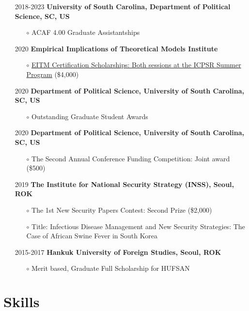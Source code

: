 \documentclass[margin,line]{res}
\begin{document}
\begin{resume}
\begin{itemize}[wide = 0pt] \itemsep 1.5mm
	\item[2018-2023] \textbf{University of South Carolina, Department of Political Science, SC, US}
	\begin{itemize} 
		\item[$\circ$] ACAF 4.00 Graduate Assistantships
	\end{itemize} 
	\item[2020] \textbf{Empirical Implications of Theoretical Models Institute}
	\begin{itemize}
		\item[$\circ$] \href{https://52.2.147.143/icpsrweb/content/sumprog/scholarships/winners-2020.html}{EITM Certification Scholarships: Both sessions at the ICPSR Summer Program} (\$4,000)
	\end{itemize} 
	\item[2020] \textbf{Department of Political Science, University of South Carolina, SC, US}
	\begin{itemize}
		\item[$\circ$] Outstanding Graduate Student Awards
	\end{itemize} 
	\item[2020] \textbf{Department of Political Science, University of South Carolina, SC, US}
	\begin{itemize}
		\item[$\circ$] The Second Annual Conference Funding Competition: Joint award (\$500)
	\end{itemize} 
	\item[2019] \textbf{The Institute for National Security Strategy (INSS), Seoul, ROK}
	\begin{itemize}\itemsep -1mm 
		\item[$\circ$] The 1st New Security Papers Contest: Second Prize (\$2,000)
		\item[$\circ$] Title: Infectious Disease Management and New Security Strategies: The Case of African Swine Fever in South Korea
	\end{itemize}
	\item[2015-2017] \textbf{Hankuk University of Foreign Studies, Seoul, ROK}
	\begin{itemize} 
		\item[$\circ$] Merit based, Graduate Full Scholarship for HUFSAN
	\end{itemize}
\end{itemize}

\section{\sc Skills} 


\end{resume}
\end{document}
